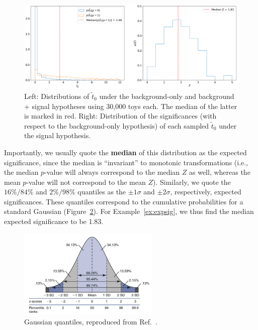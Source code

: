 \begin{figure}[htb]
\centering
\includegraphics[width=\textwidth]{figures/04-expected/1.png}
\caption[Left: Distributions of $\tilde{t}_0$ under the background-only and background + signal hypotheses using 30,000 toys each.]{Left: Distributions of $\tilde{t}_0$ under the background-only and background + signal hypotheses using 30,000 toys each.
The median of the latter is marked in red.
Right: Distribution of the significances (with respect to the background-only hypothesis) of each sampled $\tilde{t}_0$ under the signal hypothesis.
}
\label{fig:expZ}
\end{figure}

Importantly, we usually quote the \textbf{median} of this distribution as the expected significance, since the median is ``invariant'' to monotonic transformations (i.e., the median $p$-value will always correspond to the median $Z$ as well, whereas the mean $p$-value will not correspond to the mean $Z$).
Similarly, we quote the $16\%/84\%$ and $2\%/98\%$ quantiles as the $\pm 1\sigma$ and $\pm 2\sigma$, respectively, expected significances.
These quantiles correspond to the cumulative probabilities for a standard Gaussian (Figure~\ref{fig:gaussian_quantiles}).
For Example~\ref{ex:expsig}, we thus find the median expected significance to be 1.83.

\begin{figure}[htb]
\centering
\includegraphics[width=0.6\textwidth]{figures/04-expected/gaussian_quantiles.png}
\captionsetup{justification=centering}
\caption{Gaussian quantiles, reproduced from Ref.~\cite{Stiller:thesis}.}
\label{fig:gaussian_quantiles}
\end{figure}

